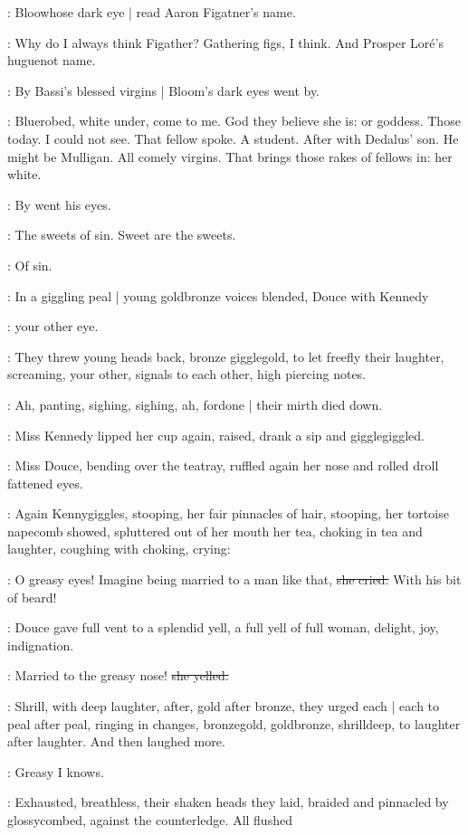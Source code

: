 :
Bloowhose dark eye |
read Aaron Figatner's name.

\BloomInt:
Why do I always think Figather?
Gathering figs,
I think.
And Prosper Loré's huguenot name.

:
By Bassi's blessed virgins |
Bloom's dark eyes went by.

\BloomInt:
Bluerobed,
white under,
come to me.
God they believe she is:
or goddess.
Those today.
I could not see.
That fellow spoke.
A student.
After with Dedalus' son.
He might be Mulligan.
All comely virgins.
That brings those rakes of fellows in:
her white.

:
By went his eyes.

\BloomInt:
The sweets of sin.
Sweet are the sweets.

\BloomInt:
Of sin.

:
In a giggling peal |
young goldbronze voices blended,
Douce with Kennedy

\MissK:
your other eye.

:
They threw young heads back,
bronze gigglegold,
to let freefly their laughter,
screaming,
your other,
signals to each other,
high piercing notes.

:
Ah,
panting,
sighing,
sighing,
ah,
fordone |
their mirth died down.

:
Miss Kennedy lipped her cup again,
raised,
drank a sip and gigglegiggled.

:
Miss Douce,
bending over the teatray,
ruffled again her nose
and rolled droll fattened eyes.

:
Again Kennygiggles,
stooping,
her fair pinnacles of hair,
stooping,
her tortoise napecomb showed,
spluttered out of her mouth her tea,
choking in tea and laughter,
coughing with choking,
crying:

\MissK:
O greasy eyes!
Imagine being married to a man like that,
\sout{she cried.}
With his bit
of beard!

:
Douce gave full vent to a splendid yell,
a full yell of full woman,
delight,
joy,
indignation.

\MissD:
Married to the greasy nose!
\sout{she yelled.}

:
Shrill,
with deep laughter,
after,
gold after bronze,
they urged each |
each to peal after peal,
ringing in changes,
bronzegold,
goldbronze,
shrilldeep,
to laughter after laughter.
And then laughed more.

\MissK:
Greasy I knows.

:
Exhausted,
breathless,
their shaken heads they laid,
braided and pinnacled by glossycombed,
against the counterledge.
All flushed

